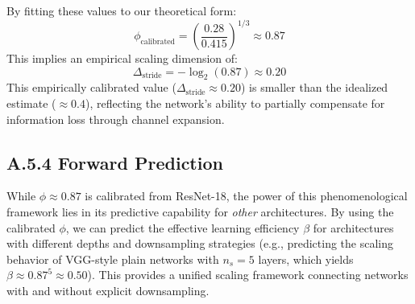 By fitting these values to our theoretical form:
\begin{equation}
\phi_{\mathrm{calibrated}} = \left(\frac{0.28}{0.415}\right)^{1/3} \approx 0.87
\end{equation}
This implies an empirical scaling dimension of:
\begin{equation}
\Delta_{\mathrm{stride}} = -\log_2(0.87) \approx 0.20
\end{equation}
This empirically calibrated value ($\Delta_{\mathrm{stride}} \approx 0.20$) is smaller than the idealized estimate ($\approx 0.4$), reflecting the network's ability to partially compensate for information loss through channel expansion.

\subsection*{A.5.4 Forward Prediction}
While $\phi \approx 0.87$ is calibrated from ResNet-18, the power of this phenomenological framework lies in its predictive capability for \emph{other} architectures. By using the calibrated $\phi$, we can predict the effective learning efficiency $\beta$ for architectures with different depths and downsampling strategies (e.g., predicting the scaling behavior of VGG-style plain networks with $n_s=5$ layers, which yields $\beta \approx 0.87^5 \approx 0.50$). This provides a unified scaling framework connecting networks with and without explicit downsampling.
